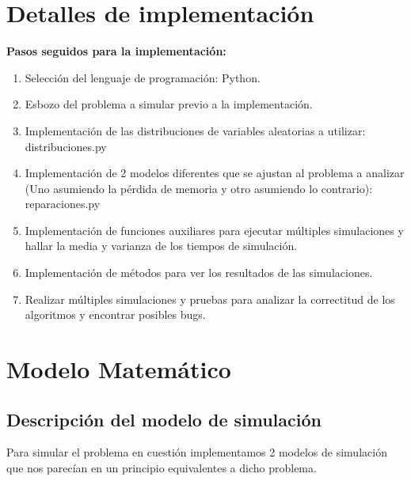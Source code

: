 \documentclass[11pt]{article}
\begin{document}
    \newpage

    \section{Detalles de implementación}
    \textbf{Pasos seguidos para la implementación:}

    \begin{enumerate}
        \item Selección del lenguaje de programación: Python.
        
        \item Esbozo del problema a simular previo a la implementación.
        
        \item Implementación de las distribuciones de variables aleatorias a utilizar: distribuciones.py
        
        \item Implementación de 2 modelos diferentes que se ajustan al problema a analizar (Uno asumiendo 
        la pérdida de memoria y otro asumiendo lo contrario): reparaciones.py
    
        \item Implementación de funciones auxiliares para ejecutar múltiples simulaciones y hallar la media
         y varianza de los tiempos de simulación.

        \item Implementación de métodos para ver los resultados de las simulaciones.
        
        \item Realizar múltiples simulaciones y pruebas para analizar la correctitud de los algoritmos y 
        encontrar posibles bugs.
    \end{enumerate}

    \newpage

    \section{Modelo Matemático}
    \subsection{Descripción del modelo de simulación}
    Para simular el problema en cuestión implementamos 2 modelos de simulación que nos parecían en un 
    principio equivalentes a dicho problema. \vspace{5mm}
    
\end{document}

